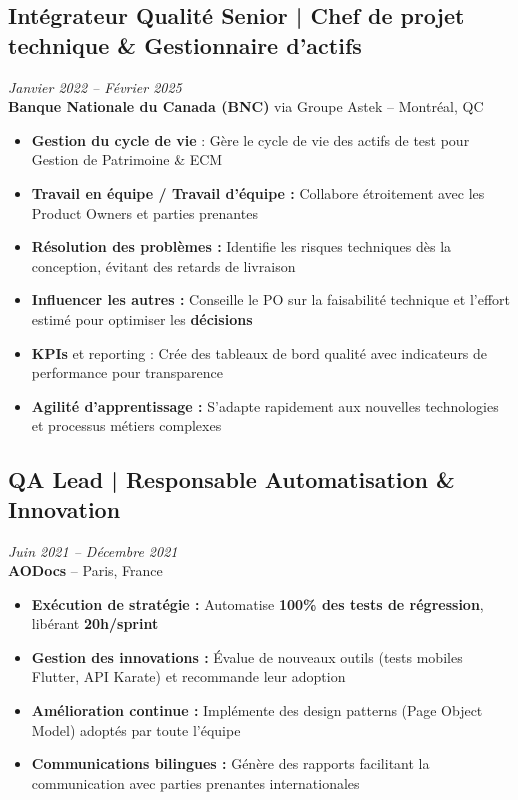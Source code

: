 \documentclass[11pt,a4paper]{article}
\newcommand{\highlight}[1]{\textcolor{primaryblue}{\textbf{#1}}}
\newcommand{\keypoint}[1]{\textbf{#1}}
\begin{document}
\subsection*{Intégrateur Qualité Senior | Chef de projet technique \& Gestionnaire d'actifs} \hfill \textit{\color{mediumgray}Janvier 2022 -- Février 2025}\\
\textcolor{primaryblue}{\textbf{Banque Nationale du Canada (BNC)}} via Groupe Astek -- Montréal, QC
\begin{itemize}[leftmargin=22pt]
    \item \highlight{Gestion du cycle de vie} : Gère le cycle de vie des actifs de test pour Gestion de Patrimoine \& ECM
    \item \highlight{Travail en équipe / Travail d'équipe :} Collabore étroitement avec les Product Owners et parties prenantes
    \item \highlight{Résolution des problèmes :} Identifie les risques techniques dès la conception, évitant des retards de livraison
    \item \highlight{Influencer les autres :} Conseille le PO sur la faisabilité technique et l'effort estimé pour optimiser les \highlight{décisions}
    \item \highlight{KPIs} et reporting : Crée des tableaux de bord qualité avec indicateurs de performance pour transparence
    \item \highlight{Agilité d'apprentissage :} S'adapte rapidement aux nouvelles technologies et processus métiers complexes
\end{itemize}

\subsection*{QA Lead | Responsable Automatisation \& Innovation} \hfill \textit{\color{mediumgray}Juin 2021 -- Décembre 2021}\\
\textcolor{primaryblue}{\textbf{AODocs}} -- Paris, France
\begin{itemize}[leftmargin=22pt]
    \item \highlight{Exécution de stratégie :} Automatise \keypoint{100\% des tests de régression}, libérant \keypoint{20h/sprint}
    \item \highlight{Gestion des innovations :} Évalue de nouveaux outils (tests mobiles Flutter, API Karate) et recommande leur adoption
    \item \highlight{Amélioration continue :} Implémente des design patterns (Page Object Model) adoptés par toute l'équipe
    \item \highlight{Communications bilingues :} Génère des rapports facilitant la communication avec parties prenantes internationales
\end{itemize}
\end{document}
